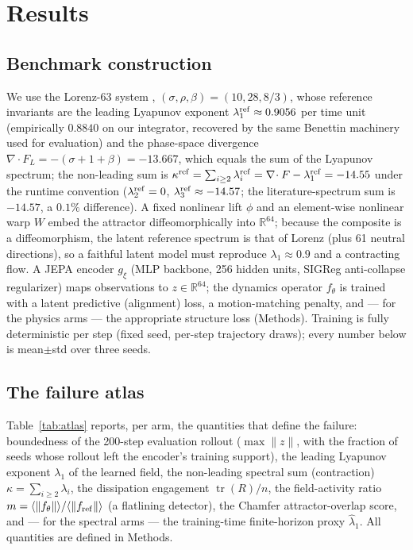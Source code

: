 \documentclass[journal]{IEEEtran}
\newcommand{\R}{\mathbb{R}}
\newcommand{\tr}{\operatorname{tr}}
\newcommand{\grad}{\nabla}
\begin{document}
\section{Results}
\label{sec:results}

\subsection{Benchmark construction}
\label{sec:bench}

We use the Lorenz-63 system \cite{lorenz1963deterministic},
$(\sigma,\rho,\beta)=(10,28,8/3)$, whose reference invariants are the
leading Lyapunov exponent $\lambda_1^{\rm ref}\approx 0.9056$ per time
unit (empirically $0.8840$ on our integrator, recovered by the same
Benettin machinery used for evaluation) and the phase-space divergence
$\grad\!\cdot F_L=-(\sigma+1+\beta)=-13.667$, which equals the sum of the
Lyapunov spectrum; the non-leading sum is $\kappa^{\rm ref}=\sum_{i\ge2}
\lambda_i^{\rm ref}=\grad\!\cdot F-\lambda_1^{\rm ref}=-14.55$ under the
runtime convention ($\lambda_2^{\rm ref}=0$, $\lambda_3^{\rm ref}
\approx-14.57$; the literature-spectrum sum is $-14.57$, a $0.1\%$
difference). A fixed nonlinear lift $\phi$ and an element-wise
nonlinear warp $W$ embed the attractor diffeomorphically into $\R^{64}$;
because the composite is a diffeomorphism, the latent reference spectrum
is that of Lorenz (plus 61 neutral directions), so a faithful latent
model must reproduce $\lambda_1\approx0.9$ and a contracting flow. A JEPA
encoder $g_\xi$ (MLP backbone, 256 hidden units, SIGReg
\cite{bardes2024sigreg} anti-collapse regularizer) maps observations to
$z\in\R^{64}$; the dynamics operator $f_\theta$ is trained with a latent
predictive (alignment) loss, a motion-matching penalty, and --- for the
physics arms --- the appropriate structure loss (Methods). Training is
fully deterministic per step (fixed seed, per-step trajectory draws);
every number below is mean$\pm$std over three seeds.

\subsection{The failure atlas}
\label{sec:atlas}

Table~\ref{tab:atlas} reports, per arm, the quantities that define the
failure: boundedness of the 200-step evaluation rollout ($\max\|z\|$,
with the fraction of seeds whose rollout left the encoder's training
support), the leading Lyapunov exponent $\lambda_1$ of the learned field,
the non-leading spectral sum (contraction) $\kappa=\sum_{i\ge2}\lambda_i$,
the dissipation engagement $\tr(R)/n$, the field-activity ratio
$m=\langle\|f_\theta\|\rangle/\langle\|f_{\rm ref}\|\rangle$ (a
flatlining detector), the Chamfer attractor-overlap score, and --- for
the spectral arms --- the training-time finite-horizon proxy
$\hat\lambda_1$. All quantities are defined in Methods.
\end{document}
